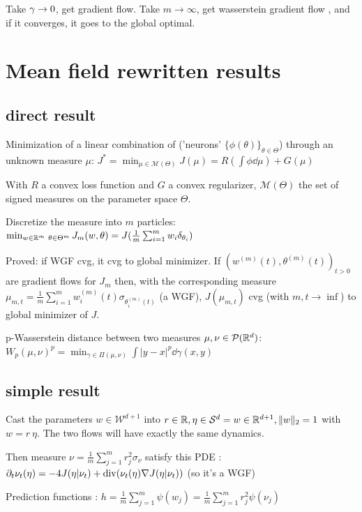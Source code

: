Take $\gamma \to 0$, get gradient flow. Take $m \to \infty$, get wasserstein gradient flow \citep{bachGradientDescentInfinitely2021}, and if it converges, it goes to the global optimal.

\section{Mean field rewritten results}
\subsection{direct result}

Minimization of a linear combination of ('neurons' $\{\phi(\theta)\}_{\theta \in \Theta}$) through an unknown measure $\mu$: $J^* = \min_{\mu \in \mathcal{M}(\Theta)} J(\mu) = R(\int \phi \dd \mu) + G(\mu)$

With $R$ a convex loss function and $G$ a convex regularizer, $\mathcal{M}(\Theta)$ the set of signed measures on the parameter space $\Theta$.

Discretize the measure into $m$ particles: $\min_{w \in \mathbb{R}^m \\\ \theta \in \Theta^m} J_m(w, \theta) = J( \frac{1}{m} \sum_{i=1}^{m} w_i \delta_{\theta_i})$

Proved: if WGF cvg, it cvg to global minimizer. If $(w^{(m)}(t), \theta^{(m)}(t))_{t>0}$ are gradient flows for $J_m$ then, with the corresponding measure $\mu_{m,t} = \frac{1}{m} \sum_{i=1}^{m} w^{(m)}_i(t) \sigma_{\theta_i^{(m)}(t)}$ (a WGF), $J(\mu_{m, t})$ cvg (with $m, t \rightarrow \inf$) to global minimizer of $J$.

p-Wasserstein distance between two measures $\mu, \nu \in \mathcal{P}(\mathbb{R}^d)$: $W_p(\mu, \nu)^p = \min_{\gamma \in \Pi(\mu, \nu)} \int |y - x|^p \dd \gamma(x, y)$

\subsection{simple result}

Cast the parameters $w \in \mathcal{W}^{d+1}$ into $r \in \mathbb{R}, \eta \in \mathcal{S}^d = {w \in \mathbb{R}^{d+1}, \lVert w\rVert_2 = 1}$ with $w = r ~ \eta$. The two flows will have exactly the same dynamics.

Then measure $\nu= \frac{1}{m}\sum_{j=1}^{m} r^2_j \sigma_{\nu}$ satisfy this PDE : $\partial_t \nu_t(\eta) = -4 J(\eta | \nu_t) + \operatorname*{div}(\nu_t(\eta) \nabla J(\eta | \nu_t)) $ (so it's a WGF)

Prediction functions : $h = \frac{1}{m} \sum_{j=1}^{m} \psi(w_j) = \frac{1}{m}\sum_{j=1}^{m} r_j^2 \psi(\nu_j)$


